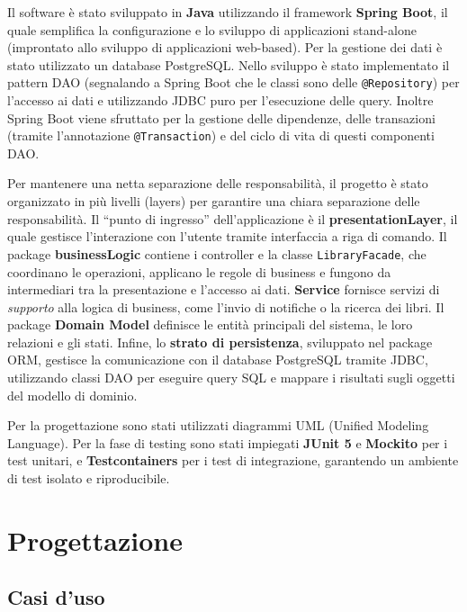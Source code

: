 \documentclass[
  italian,
  paper=a4,
  ,captions=tableheading
]{scrbook}
\newcommand{\passthrough}[1]{#1}
\begin{document}
Il software è stato sviluppato in \textbf{Java} utilizzando il framework
\textbf{Spring Boot}, il quale semplifica la configurazione e lo
sviluppo di applicazioni stand-alone (improntato allo sviluppo di
applicazioni web-based). Per la gestione dei dati è stato utilizzato un
database PostgreSQL. Nello sviluppo è stato implementato il pattern DAO
(segnalando a Spring Boot che le classi sono delle
\passthrough{\lstinline!@Repository!}) per l'accesso ai dati e
utilizzando JDBC puro per l'esecuzione delle query. Inoltre Spring Boot
viene sfruttato per la gestione delle dipendenze, delle transazioni
(tramite l'annotazione \passthrough{\lstinline!@Transaction!}) e del
ciclo di vita di questi componenti DAO.

Per mantenere una netta separazione delle responsabilità, il progetto è
stato organizzato in più livelli (layers) per garantire una chiara
separazione delle responsabilità. Il ``punto di ingresso''
dell'applicazione è il \textbf{presentationLayer}, il quale gestisce
l'interazione con l'utente tramite interfaccia a riga di comando. Il
package \textbf{businessLogic} contiene i controller e la classe
\passthrough{\lstinline!LibraryFacade!}, che coordinano le operazioni,
applicano le regole di business e fungono da intermediari tra la
presentazione e l'accesso ai dati. \textbf{Service} fornisce servizi di
\emph{supporto} alla logica di business, come l'invio di notifiche o la
ricerca dei libri. Il package \textbf{Domain Model} definisce le entità
principali del sistema, le loro relazioni e gli stati. Infine, lo
\textbf{strato di persistenza}, sviluppato nel package ORM, gestisce la
comunicazione con il database PostgreSQL tramite JDBC, utilizzando
classi DAO per eseguire query SQL e mappare i risultati sugli oggetti
del modello di dominio.

Per la progettazione sono stati utilizzati diagrammi UML (Unified
Modeling Language). Per la fase di testing sono stati impiegati
\textbf{JUnit 5} e \textbf{Mockito} per i test unitari, e
\textbf{Testcontainers} per i test di integrazione, garantendo un
ambiente di test isolato e riproducibile.

\chapter{Progettazione}\label{progettazione}

\section{Casi d'uso}\label{casi-duso}
\end{document}
